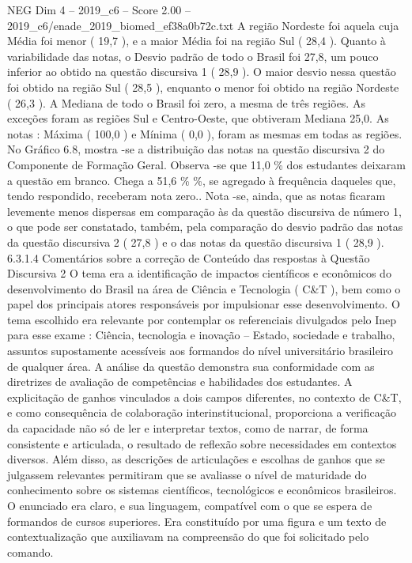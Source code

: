 \begin{textsample}{NEG Dim 4 – 2019\_c6 – Score 2.00 – 2019\_c6/enade\_2019\_biomed\_ef38a0b72c.txt}
A região Nordeste foi aquela cuja Média foi menor ( 19,7 ), e a maior Média foi na região Sul ( 28,4 ).
Quanto à variabilidade das notas, o Desvio padrão de todo o Brasil foi 27,8, um pouco inferior ao obtido na questão discursiva 1 ( 28,9 ).
O maior desvio nessa questão foi obtido na região Sul ( 28,5 ), enquanto o menor foi obtido na região Nordeste ( 26,3 ).
A Mediana de todo o Brasil foi zero, a mesma de três regiões.
As exceções foram as regiões Sul e Centro-Oeste, que obtiveram Mediana 25,0.
As notas : Máxima ( 100,0 ) e Mínima ( 0,0 ), foram as mesmas em todas as regiões.
No Gráfico 6.8, mostra -se a distribuição das notas na questão discursiva 2 do Componente de Formação Geral.
Observa -se que 11,0 \% dos estudantes deixaram a questão em branco.
Chega a 51,6 \% \%, se agregado à frequência daqueles que, tendo respondido, receberam nota zero..
Nota -se, ainda, que as notas ficaram levemente menos dispersas em comparação às da questão discursiva de número 1, o que pode ser constatado, também, pela comparação do desvio padrão das notas da questão discursiva 2 ( 27,8 ) e o das notas da questão discursiva 1 ( 28,9 ). 6.3.1.4 Comentários sobre a correção de Conteúdo das respostas à Questão Discursiva 2 O tema era a identificação de impactos científicos e econômicos do desenvolvimento do Brasil na área de Ciência e Tecnologia ( C\&T ), bem como o papel dos principais atores responsáveis por impulsionar esse desenvolvimento.
O tema escolhido era relevante por contemplar os referenciais divulgados pelo Inep para esse exame : Ciência, tecnologia e inovação – Estado, sociedade e trabalho, assuntos supostamente acessíveis aos formandos do nível universitário brasileiro de qualquer área.
A análise da questão demonstra sua conformidade com as diretrizes de avaliação de competências e habilidades dos estudantes.
A explicitação de ganhos vinculados a dois campos diferentes, no contexto de C\&T, e como consequência de colaboração interinstitucional, proporciona a verificação da capacidade não só de ler e interpretar textos, como de narrar, de forma consistente e articulada, o resultado de reflexão sobre necessidades em contextos diversos.
Além disso, as descrições de articulações e escolhas de ganhos que se julgassem relevantes permitiram que se avaliasse o nível de maturidade do conhecimento sobre os sistemas científicos, tecnológicos e econômicos brasileiros.
O enunciado era claro, e sua linguagem, compatível com o que se espera de formandos de cursos superiores.
Era constituído por uma figura e um texto de contextualização que auxiliavam na compreensão do que foi solicitado pelo comando.

\end{textsample}

